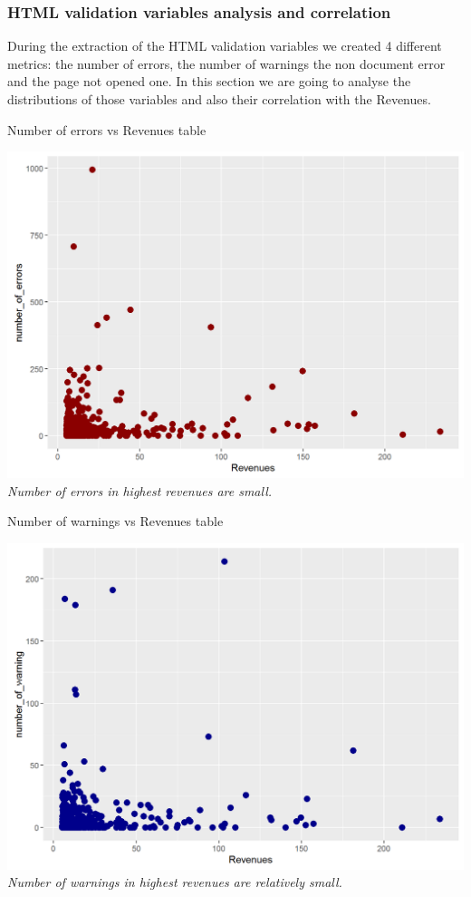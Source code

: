 \documentclass{book}
\begin{document}
\subsubsection{HTML validation variables analysis and correlation}
During the extraction of the HTML validation variables we created 4 different metrics: the number of errors, the number of warnings the non document error and the page not opened one. In this section we are going to analyse the distributions of those variables and also their correlation with the Revenues.
\begin{table}[H]
\centering
\caption{Number of errors vs Revenues table}
\begin{center}
\includegraphics[scale=0.5]{../R/photos/45_errors_rev.png}    \\
\textit{Number of errors in highest revenues are small.}
\end{center}
\end{table}
\begin{table}[H]
\centering
\caption{Number of warnings vs Revenues table}
\begin{center}
\includegraphics[scale=0.5]{../R/photos/47_warn_rev.png}    \\
\textit{Number of warnings in highest revenues are relatively small.}
\end{center}
\end{table}
\end{document}

